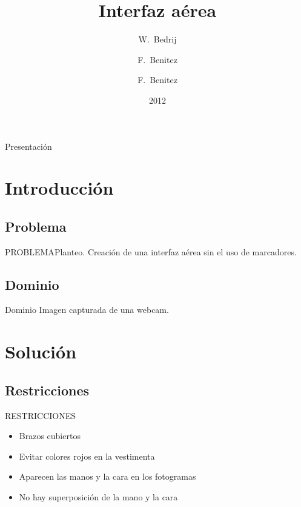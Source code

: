\documentclass{beamer}
\title[Interfaz aérea] %
{Interfaz aérea}
\author[] %
{W.~Bedrij\inst{1} \and F.~Benitez\inst{1} \and F.~Benitez\inst{1}}
\institute[Universities of Somewhere and Elsewhere] %
{
  \inst{1}%
  Facultad de Ingeniería y Ciencias Hídricas\\
  Universidad Nacional del Litoral}
\date[Short Occasion] %
{2012}
\begin{document}
\begin{frame}
  \titlepage
\end{frame}

\begin{frame}{Presentación}
  \tableofcontents
\end{frame}




\section{Introducción}

\subsection[Problema]{Problema}

\begin{frame}{PROBLEMA}{Planteo.}
  	Creación de una interfaz aérea sin el uso de marcadores.
\end{frame}

\subsection[Dominio]{Dominio}
\begin{frame}{Dominio}
	Imagen capturada de una webcam.
\end{frame}


\section{Solución}

\subsection[Restricciones]{Restricciones}
\begin{frame}{RESTRICCIONES}
	\begin{itemize}
	  \item
		Brazos cubiertos
	  \item
		Evitar colores rojos en la vestimenta
	  \item
		Aparecen las manos y la cara en los fotogramas
	  \item
		No hay superposición de la mano y la cara
	\end{itemize}
\end{frame}
\end{document}

